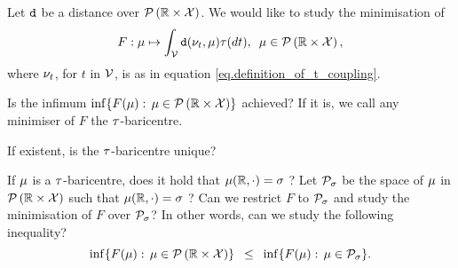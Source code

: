 Let $\bariDistance$ be a distance over 
$\probabilitiesOver{\R\times\statisticsSpace}$.
We would like to study the minimisation of
\begin{equation}
\label{eq.baricentre_minimisation}
F: 
\baricentre 
\mapsto
\int_{\givenFamily} \bariDistance(\coupling[t], \baricentre) \familiyDistribution(dt),
\,\,\,
\baricentre \in \probabilitiesOver{\R\times\statisticsSpace},
\end{equation}
where
$\coupling[t]$, 
for $t$ in $\givenFamily$, 
is as in equation \eqref{eq.definition_of_t_coupling}.

Is the infimum
$\inf\lbrace F(\baricentre): \, \baricentre \in \probabilitiesOver{\R\times\statisticsSpace}\rbrace$
achieved?
If it is, we call any minimiser of $F$ the 
$\familiyDistribution$-baricentre.

If existent, is the $\familiyDistribution$-baricentre unique?

If $\baricentre$ is a $\familiyDistribution$-baricentre,
does it hold that
$
\baricentre(\R, \cdot) = \pushforwardStat
$
?
Let 
$\mathcal{P}_{\pushforwardStat}$
be the space
of 
$\baricentre$ in 
$\probabilitiesOver{\R\times\statisticsSpace}$ 
such that 
$
\baricentre(\R, \cdot) = \pushforwardStat
$
?
Can we restrict  $F$ to $\mathcal{P}_{\pushforwardStat}$ 
and
study the minimisation of $F$ over $\mathcal{P}_{\pushforwardStat}$? 
In other words, can we study the following inequality?
\begin{equation*}
\inf
\lbrace 
F(\baricentre): \, 
\baricentre \in \probabilitiesOver{\R\times\statisticsSpace}
\rbrace
\,\,\,
\leq
\,\,\,
\inf
\lbrace 
F(\baricentre): \, 
\baricentre \in \mathcal{P}_{\pushforwardStat}
\rbrace
.
\end{equation*}


